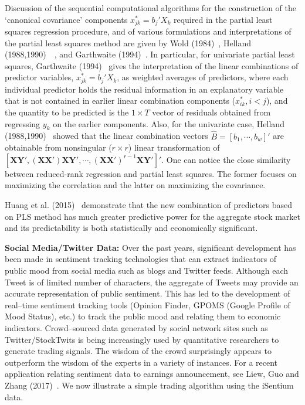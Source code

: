 Discussion of the sequential computational algorithms for the construction of the `canonical covariance' components $x_{jk}^*=b_j'X_k$ required in the partial least squares regression procedure, and of various formulations and interpretations of the partial least squares method are given by Wold (1984)~\cite{wold}, Helland (1988,1990)~\cite{helland88}~\cite{helland90}, and Garthwaite (1994)~\cite{garth}. In particular, for univariate partial least squares, Garthwaite (1994)~\cite{garth} gives the interpretation of the linear combinations of predictor variables, $x_{jk}^*=b_j'X_k$, as weighted averages of predictors, where each individual predictor holds the residual information in an explanatory variable that is not contained in earlier linear combination components ($x_{ik}^*, i<j$), and the quantity to be predicted is the $1 \times T$ vector of residuals obtained from regressing $y_k$ on the earlier components. Also, for the univariate case, Helland (1988,1990)~\cite{helland88,helland90} showed that the linear combination vectors $\hat{B}=[b_1,\cdots,b_w]'$ are obtainable from nonsingular ($r \times r$) linear transformation of $[\mathbf{XY'},  (\mathbf{XX'})\mathbf{XY'}, \cdots, (\mathbf{XX'})^{r-1} \mathbf{XY'}]'$. One can notice the close similarity between reduced-rank regression and partial least squares. The former focuses on maximizing the correlation and the latter on maximizing the covariance.


Huang et al. (2015)~\cite{huang} demonstrate that the new combination of predictors based on PLS method has much greater predictive power for the aggregate stock market and its predictability is both statistically and economically significant. \twomedskip


\noindent \textbf{Social Media/Twitter Data:} Over the past years, significant development has been made in sentiment tracking technologies that can extract indicators of public mood from social media such as blogs and Twitter feeds. Although each Tweet is of limited number of characters, the aggregate of Tweets may provide an accurate representation of public sentiment. This has led to the development of real--time sentiment tracking tools (Opinion Finder, GPOMS (Google Profile of Mood Status), etc.) to track the public mood and relating them to economic indicators. Crowd--sourced data generated by social network sites such as Twitter/StockTwits is being increasingly used by quantitative researchers to generate trading signals. The wisdom of the crowd surprisingly appears to outperform the wisdom of the experts in a variety of instances. For a recent application relating sentiment data to earnings announcement, see Liew, Guo and Zhang (2017)~\cite{liewzhang}. We now illustrate a simple trading algorithm using the iSentium data.


